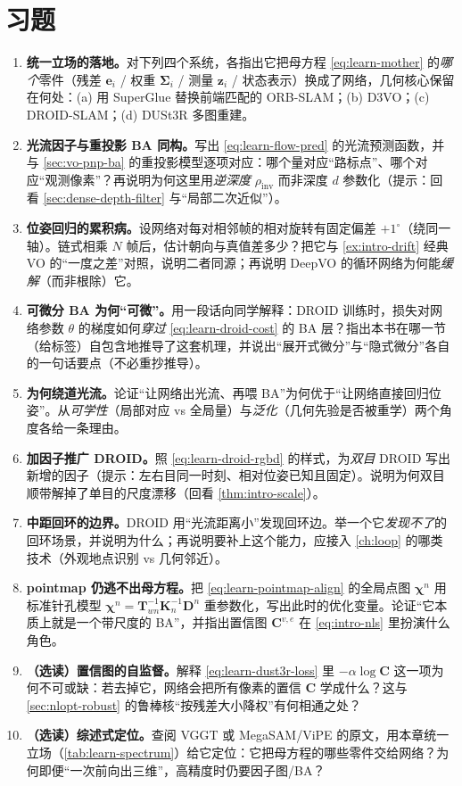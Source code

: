 \section*{习题}
\begin{enumerate}
  \item \textbf{统一立场的落地。}\;对下列四个系统，各指出它把母方程 \cref{eq:learn-mother} 的\emph{哪个}零件（残差 $\mathbf{e}_i$ / 权重 $\boldsymbol\Sigma_i$ / 测量 $\mathbf{z}_i$ / 状态表示）换成了网络，几何核心保留在何处：(a) 用 SuperGlue 替换前端匹配的 ORB-SLAM；(b) D3VO；(c) DROID-SLAM；(d) DUSt3R 多图重建。
  \item \textbf{光流因子与重投影 BA 同构。}\;写出 \cref{eq:learn-flow-pred} 的光流预测函数，并与 \cref{sec:vo-pnp-ba} 的重投影模型逐项对应：哪个量对应“路标点”、哪个对应“观测像素”？再说明为何这里用\emph{逆深度} $\rho_{\mathrm{inv}}$ 而非深度 $d$ 参数化（提示：回看 \cref{sec:dense-depth-filter} 与“局部二次近似”）。
  \item \textbf{位姿回归的累积病。}\;设网络对每对相邻帧的相对旋转有固定偏差 $+1^\circ$（绕同一轴）。链式相乘 $N$ 帧后，估计朝向与真值差多少？把它与 \cref{ex:intro-drift} 经典 VO 的“一度之差”对照，说明二者同源；再说明 DeepVO 的循环网络为何能\emph{缓解}（而非根除）它。
  \item \textbf{可微分 BA 为何“可微”。}\;用一段话向同学解释：DROID 训练时，损失对网络参数 $\theta$ 的梯度如何\emph{穿过} \cref{eq:learn-droid-cost} 的 BA 层？指出本书在哪一节（给标签）自包含地推导了这套机理，并说出“展开式微分”与“隐式微分”各自的一句话要点（不必重抄推导）。
  \item \textbf{为何绕道光流。}\;论证“让网络出光流、再喂 BA”为何优于“让网络直接回归位姿”。从\emph{可学性}（局部对应 vs 全局量）与\emph{泛化}（几何先验是否被重学）两个角度各给一条理由。
  \item \textbf{加因子推广 DROID。}\;照 \cref{eq:learn-droid-rgbd} 的样式，为\emph{双目} DROID 写出新增的因子（提示：左右目同一时刻、相对位姿已知且固定）。说明为何双目顺带解掉了单目的尺度漂移（回看 \cref{thm:intro-scale}）。
  \item \textbf{中距回环的边界。}\;DROID 用“光流距离小”发现回环边。举一个它\emph{发现不了}的回环场景，并说明为什么；再说明要补上这个能力，应接入 \cref{ch:loop} 的哪类技术（外观地点识别 vs 几何邻近）。
  \item \textbf{pointmap 仍逃不出母方程。}\;把 \cref{eq:learn-pointmap-align} 的全局点图 $\boldsymbol\chi^n$ 用标准针孔模型 $\boldsymbol\chi^n=\mathbf{T}_{wn}^{-1}\mathbf{K}_n^{-1}\mathbf{D}^n$ 重参数化，写出此时的优化变量。论证“它本质上就是一个带尺度的 BA”，并指出置信图 $\mathbf{C}^{v,e}$ 在 \cref{eq:intro-nls} 里扮演什么角色。
  \item \textbf{（选读）置信图的自监督。}\;解释 \cref{eq:learn-dust3r-loss} 里 $-\alpha\log\mathbf{C}$ 这一项为何不可或缺：若去掉它，网络会把所有像素的置信 $\mathbf{C}$ 学成什么？这与 \cref{sec:nlopt-robust} 的鲁棒核“按残差大小降权”有何相通之处？
  \item \textbf{（选读）综述式定位。}\;查阅 VGGT 或 MegaSAM/ViPE 的原文，用本章统一立场（\cref{tab:learn-spectrum}）给它定位：它把母方程的哪些零件交给网络？为何即便“一次前向出三维”，高精度时仍要因子图/BA？
\end{enumerate}
